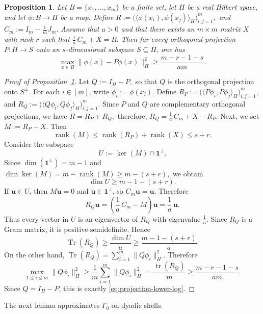 \documentclass[11pt]{article}
\newtheorem{prop}[theorem]{Proposition}
\theoremstyle{definition}
\begin{document}
\begin{prop}\label{prop:projection-logn}
Let $B=\{x_1,\dots,x_m\}$ be a finite set, let $H$ be a real Hilbert space, and let
\(
\phi:B\to H
\)
be a map. Define
\(
R
:=
\bigl(\langle \phi(x_i),\phi(x_j)\rangle_H\bigr)_{i,j=1}^m,\)
and
\(
C_m:=I_m-\frac{1}{m}J_{m}.
\)
Assume that $a>0$ and that there exists an $m\times m$ matrix $X$ with rank $r$
such that
\(
\frac{1}{a}\,C_m+X=R.
\)
Then for every orthogonal projection $P:H\to S$ onto an $s$-dimensional subspace
$S\subseteq H$, one has
\begin{equation}\label{eq:projection-lower-log}
\max_{x\in B} \|\phi(x)-P\phi(x)\|_H^2
\ge
\frac{m-r-1-s}{am}.
\end{equation}
\end{prop}
\begin{proof}[Proof of Proposition~\ref{prop:projection-logn}]
    Let
\(
Q:=I_H-P,
\)
so that $Q$ is the orthogonal projection onto $S^\perp$. For each $i\in[m]$, write
\(
\phi_i:=\phi(x_i).
\)
Define
\(
R_P
:=
\bigl(\langle P\phi_i,P\phi_j\rangle_H\bigr)_{i,j=1}^m,
\) and
\(
R_Q
:=
\bigl(\langle Q\phi_i,Q\phi_j\rangle_H\bigr)_{i,j=1}^m.
\)
Since $P$ and $Q$ are complementary orthogonal projections, we have
\(
R=R_P+R_Q,\)
therefore,
\(
R_Q=\frac1a\,C_m+X-R_P.
\)
Next, we set
\(
M:=R_P-X.
\)
Then
\[
\operatorname{rank}(M)
\le
\operatorname{rank}(R_P)+\operatorname{rank}(X)
\le s+r.
\]
Consider the subspace
\[
U:=\ker(M)\cap \boldsymbol{1}^\perp.
\]
Since $\dim(\boldsymbol{1}^\perp)=m-1$ and
\(
\dim\ker(M)=m-\operatorname{rank}(M)\ge m-(s+r),
\)
we obtain
\[
\dim U\ge m-1-(s+r).
\]
If $\boldsymbol u\in U$, then $M\boldsymbol u=0$ and $\boldsymbol u\in\boldsymbol{1}^\perp$, so $C_m \boldsymbol u=\boldsymbol u$. Therefore
\[
R_Q\boldsymbol u=\left(\frac1a\,C_m-M\right)\boldsymbol u=\frac1a\,\boldsymbol u.
\]
Thus every vector in $U$ is an eigenvector of $R_Q$ with eigenvalue $\frac{1}{a}$.
Since $R_Q$ is a Gram matrix, it is positive semidefinite. Hence
\[
\operatorname{Tr}(R_Q)\ge \frac{\dim U}{a}\ge \frac{m-1-(s+r)}{a}.
\]
On the other hand,
\(
\operatorname{Tr}(R_Q)
=
\sum_{i=1}^m \|Q\phi_i\|_H^2.
\)
Therefore
\[
\max_{1\le i\le m}\|Q\phi_i\|_H^2
\ge
\frac1m\sum_{i=1}^m \|Q\phi_i\|_H^2
=
\frac{\operatorname{tr}(R_Q)}{m}
\ge
\frac{m-r-1-s}{am}.
\]
Since $Q=I_H-P$, this is exactly \eqref{eq:projection-lower-log}.
\end{proof}

The next lemma approximates $\Gamma_0$ on dyadic shells.
\end{document}
